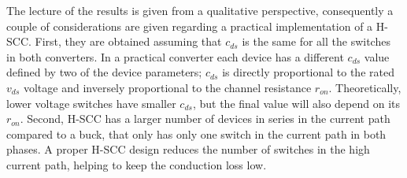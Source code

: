 The lecture of the results is given from a qualitative perspective, consequently a couple of considerations are given regarding a practical implementation of a H-SCC. First, they are obtained assuming that $c_{ds}$ is the same for all the switches in both converters. In a practical converter each device has a different $c_{ds}$ value defined by two of the device parameters; $c_{ds}$ is directly proportional to the rated $v_{ds}$  voltage and inversely proportional to the channel resistance $r_{on}$. Theoretically, lower voltage switches have smaller $c_{ds}$, but the final value will also depend on its $r_{on}$. Second, H-SCC has a larger number of devices in series in the current path compared to a buck, that only has only one switch in the current path in both phases. A proper H-SCC design reduces the number of switches in the high current path, helping to keep the conduction loss low.


